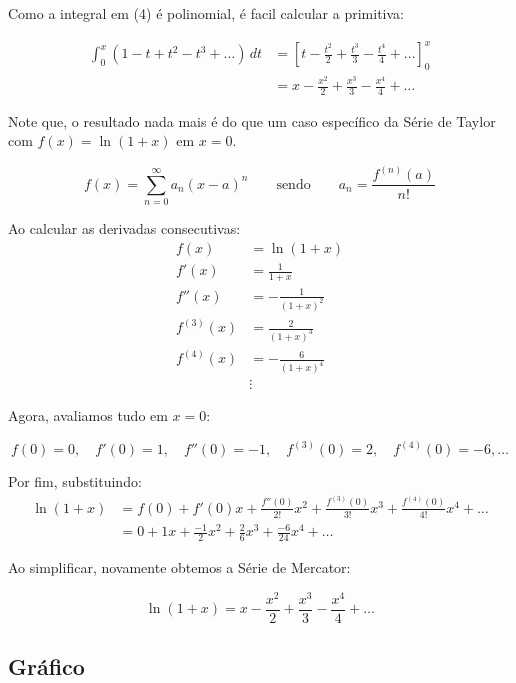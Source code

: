 Como a integral em (4) é polinomial, é facil calcular a primitiva:

\begin{align*}
    \int_{0}^{x} (1 -t+t^2-t^3 + \ldots) \,dt &= \left[ t - \frac{t^2}{2} + \frac{t^3}{3} - \frac{t^4}{4} + \ldots \right]_{0}^{x} \\
                                              &= x - \frac{x^2}{2} + \frac{x^3}{3} - \frac{x^4}{4} + \ldots
\end{align*}

Note que, o resultado nada mais é do que um caso específico da Série de Taylor com $f(x) = \ln(1+x)$ em $x=0$.

\begin{equation*}
    f(x) = \sum_{n=0}^{\infty} a_n (x-a)^n \qquad \text{sendo} \qquad a_n = \frac{f^{(n)}(a)}{n!}
\end{equation*}

Ao calcular as derivadas consecutivas:
\begin{align*}
    f(x) &= \ln(1+x) \\
    f'(x) &= \frac{1}{1+x} \\
    f''(x) &= -\frac{1}{(1+x)^2} \\
    f^{(3)}(x) &= \frac{2}{(1+x)^3} \\
    f^{(4)}(x) &= -\frac{6}{(1+x)^4} \\
    &\vdots
\end{align*}

Agora, avaliamos tudo em $x=0$:

\[
f(0) = 0, \quad f'(0) = 1, \quad f''(0) = -1, \quad f^{(3)}(0) = 2, \quad f^{(4)}(0) = -6, \ldots
\]

Por fim, substituindo:
\begin{align*}
    \ln(1+x) &= f(0) + f'(0)x + \frac{f''(0)}{2!}x^2 + \frac{f^{(3)}(0)}{3!}x^3 + \frac{f^{(4)}(0)}{4!}x^4 + \ldots \\
             &= 0 + 1x + \frac{-1}{2}x^2 + \frac{2}{6}x^3 + \frac{-6}{24}x^4 + \ldots
\end{align*}

Ao simplificar, novamente obtemos a Série de Mercator:

\[
\ln(1+x) = x - \frac{x^2}{2} + \frac{x^3}{3} - \frac{x^4}{4} + \ldots
\]

\subsection{Gráfico}

